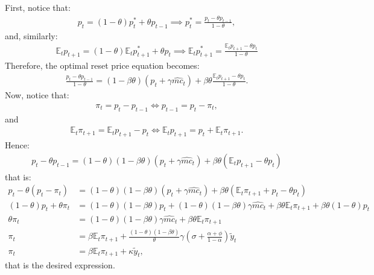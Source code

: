\documentclass[dvipsnames,11pt]{article}
\begin{document}
\begin{enumerate}
            \begin{solution}
First, notice that:
\begin{align*}
    p_t=(1-\theta)p_t^* +\theta p_{t-1} \implies p_t^*=\frac{p_t-\theta p_{t-1}}{1-\theta},
\end{align*}
and, similarly:
\begin{align*}
    \mathbb{E}_tp_{t+1}=(1-\theta)\mathbb{E}_tp_{t+1}^* +\theta p_{t} \implies \mathbb{E}_tp_{t+1}^*=\frac{\mathbb{E}_tp_{t+1}-\theta p_{t}}{1-\theta}
\end{align*}
Therefore, the optimal reset price equation becomes:
\begin{align*}
    \frac{p_t-\theta p_{t-1}}{1-\theta}=(1-\beta\theta)(p_t+\gamma \widehat{mc}_t)+\beta \theta \frac{ \mathbb{E}_tp_{t+1}-\theta p_t}{1-\theta}.
\end{align*}
Now, notice that:
\begin{align*}
    \pi_t= p_t-p_{t-1} \iff p_{t-1}=p_t-\pi_t,
\end{align*}
and
\begin{align*}
    \mathbb{E}_t\pi_{t+1}=\mathbb{E}_t p_{t+1}-p_t \iff \mathbb{E}_tp_{t+1}=p_t+\mathbb{E}_t\pi_{t+1}.
\end{align*}
Hence:
\begin{align*}
    p_t-\theta p_{t-1}=(1-\theta)(1-\beta \theta)(p_t+\gamma \widehat{mc}_t)+\beta \theta (\mathbb{E}_t p_{t+1}-\theta p_t)
\end{align*}
that is:
\begin{align*}
    p_t-\theta(p_t-\pi_t)&=(1-\theta)(1-\beta \theta)(p_t + \gamma \widehat{mc}_t)+\beta \theta (\mathbb{E}_t \pi_{t+1}+p_t-\theta p_t) \\
    (1-\theta)p_t+\theta \pi_t&=(1-\theta)(1-\beta \theta)p_t + (1-\theta)(1-\beta \theta)\gamma \widehat{mc}_t+\beta \theta \mathbb{E}_t \pi_{t+1}+\beta \theta(1-\theta)p_t \\
    \theta\pi_t&=(1-\theta)(1-\beta \theta) \gamma \widehat{mc}_t +\beta \theta \mathbb{E}_t \pi_{t+1} \\
    \pi_t&=\beta \mathbb{E}_t \pi_{t+1}+\frac{(1-\theta)(1-\beta \theta)}{\theta}\gamma \left( \sigma + \frac{\alpha+\phi}{1-\alpha} \right) \tilde{y}_t \\
    \pi_t &= \beta \mathbb{E}_t \pi_{t+1}+ \kappa \tilde{y}_t,
\end{align*}
that is the desired expression.
                
            \end{solution}
            
    \end{enumerate}
\end{document}
